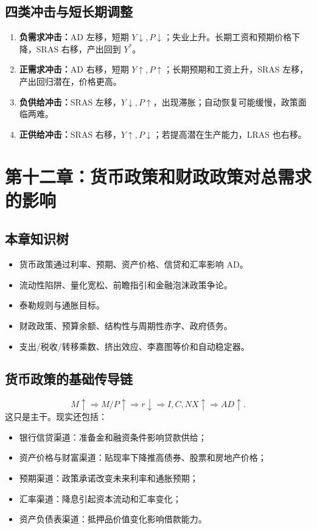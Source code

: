\documentclass[UTF8,11pt,a4paper]{ctexart}
\newcommand{\term}[1]{\textbf{#1}}
\begin{document}
\subsection{四类冲击与短长期调整}
\begin{enumerate}
  \item \term{负需求冲击：}AD 左移，短期 $Y\downarrow,P\downarrow$；失业上升。长期工资和预期价格下降，SRAS 右移，产出回到 $Y^*$。
  \item \term{正需求冲击：}AD 右移，短期 $Y\uparrow,P\uparrow$；长期预期和工资上升，SRAS 左移，产出回归潜在，价格更高。
  \item \term{负供给冲击：}SRAS 左移，$Y\downarrow,P\uparrow$，出现滞胀；自动恢复可能缓慢，政策面临两难。
  \item \term{正供给冲击：}SRAS 右移，$Y\uparrow,P\downarrow$；若提高潜在生产能力，LRAS 也右移。
\end{enumerate}

\newpage
\section{第十二章：货币政策和财政政策对总需求的影响}

\subsection{本章知识树}
\begin{itemize}
  \item 货币政策通过利率、预期、资产价格、信贷和汇率影响 AD。
  \item 流动性陷阱、量化宽松、前瞻指引和金融泡沫政策争论。
  \item 泰勒规则与通胀目标。
  \item 财政政策、预算余额、结构性与周期性赤字、政府债务。
  \item 支出/税收/转移乘数、挤出效应、李嘉图等价和自动稳定器。
\end{itemize}

\subsection{货币政策的基础传导链}
\[
M\uparrow\Rightarrow M/P\uparrow\Rightarrow r\downarrow
\Rightarrow I,C,NX\uparrow\Rightarrow AD\uparrow.
\]
这只是主干。现实还包括：
\begin{itemize}
  \item 银行信贷渠道：准备金和融资条件影响贷款供给；
  \item 资产价格与财富渠道：贴现率下降推高债券、股票和房地产价格；
  \item 预期渠道：政策承诺改变未来利率和通胀预期；
  \item 汇率渠道：降息引起资本流动和汇率变化；
  \item 资产负债表渠道：抵押品价值变化影响借款能力。
\end{itemize}
\end{document}
